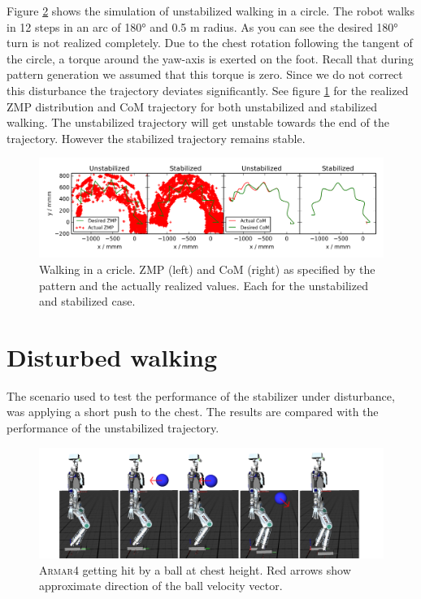 \documentclass[english,ngerman]{KITreprt}
\newcommand{\name}[1]{\textsc{#1}}
\begin{document}
Figure \ref{img:player-undisturbed-circle-thumbs} shows the simulation
of unstabilized walking in a circle. The robot walks in 12 steps in an
arc of 180° and 0.5 m radius. As you can see the desired 180° turn is
not realized completely. Due to the chest rotation following the tangent
of the circle, a torque around the yaw-axis is exerted on the foot.
Recall that during pattern generation we assumed that this torque is
zero. Since we do not correct this disturbance the trajectory deviates
significantly. See figure \ref{img:undisturbed-circle} for the realized
ZMP distribution and CoM trajectory for both unstabilized and stabilized
walking. The unstabilized trajectory will get unstable towards the end
of the trajectory. However the stabilized trajectory remains stable.

\begin{figure}[hbt]
\vspace*{-1em}
\includegraphics[width=\textwidth,resolution=300]{images/undisturbed_circle.png}
\caption{Walking in a cricle. ZMP (left) and CoM (right) as specified by the pattern and the actually realized values.
Each for the unstabilized and stabilized case.}
\label{img:undisturbed-circle}
\end{figure}

\section{Disturbed walking}\label{disturbed-walking}

The scenario used to test the performance of the stabilizer under
disturbance, was applying a short push to the chest. The results are
compared with the performance of the unstabilized trajectory.

\begin{figure}[H]
\vspace*{-1em}
\includegraphics[width=\textwidth,resolution=300]{images/disturbed_straight_thumbs.png}
\caption{\name{Armar4} getting hit by a ball at chest height. Red arrows show approximate direction of the ball velocity vector.}
\label{img:player-undisturbed-circle-thumbs}
\end{figure}
\end{document}
